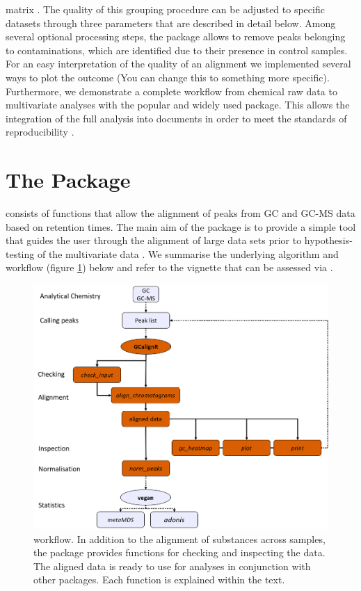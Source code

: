 matrix . The quality of this grouping procedure can be adjusted to
specific datasets through three parameters that are described in detail
below. Among several optional processing steps, the package allows to
remove peaks belonging to contaminations, which are identified due to
their presence in control samples. For an easy interpretation of the
quality of an alignment we implemented several ways to plot the outcome
(You can change this to something more specific). Furthermore, we
demonstrate a complete workflow from chemical raw data to multivariate
analyses with the popular and widely used
\href{https://cran.r-project.org/web/packages/vegan/index.html}{}
\citep{Oksanen.2016} package. This allows the integration of the full
analysis into  documents \citep{Allaire.2016} in order
to meet the standards of reproducibility \citep{Peng.2011}.

\section{The Package}

 consists of functions that allow the alignment of peaks
from GC and GC-MS data based on retention times. The main aim of the
package is to provide a simple tool that guides the user through the
alignment of large data sets prior to hypothesis-testing of the
multivariate data \citep{Anderson.2001}. We summarise the underlying
algorithm and workflow (figure \ref{figure:workflow}) below and refer to
the vignette that can be assessed via
.

\begin{figure}[htbp]
  \centering
  \includegraphics[width=13cm]{figures/workflow}
  \caption{ workflow. In addition to the alignment of substances across samples, the package provides functions for checking and inspecting the data. The aligned data is ready to use for analyses in conjunction with other packages. Each function is explained within the text.}
  \label{figure:workflow}
\end{figure}

